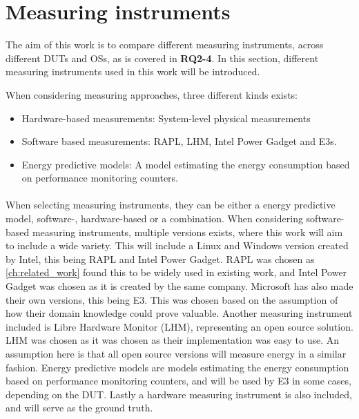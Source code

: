 \section{Measuring instruments}\label{sec:measuring_instruments}

The aim of this work is to compare different measuring instruments, across different DUTs and OSs, as is covered in \textbf{RQ2-4}. In this section, different measuring instruments used in this work will be introduced.

When considering measuring approaches, three different kinds exists:

\begin{itemize}
    \item Hardware-based measurements: System-level physical measurements
    \item Software based measurements: RAPL, LHM, Intel Power Gadget and E3s.
    \item Energy predictive models: A model estimating the energy consumption based on performance monitoring counters.
\end{itemize}

\paragraph*{}
When selecting measuring instruments, they can be either a energy predictive model, software-, hardware-based or a combination. When considering software-based measuring instruments, multiple versions exists, where this work will aim to include a wide variety. This will include a Linux and Windows version created by Intel, this being RAPL and Intel Power Gadget. RAPL was chosen as \cref*{ch:related_work} found this to be widely used in existing work, and Intel Power Gadget was chosen as it is created by the same company. Microsoft has also made their own versions, this being E3. This was chosen based on the assumption of how their domain knowledge could prove valuable. Another measuring instrument included is Libre Hardware Monitor (LHM), representing an open source solution. LHM was chosen as it was chosen as their implementation was easy to use. An assumption here is that all open source versions will measure energy in a similar fashion. Energy predictive models are models estimating the energy consumption based on performance monitoring counters, and will be used by E3 in some cases, depending on the DUT. Lastly a hardware measuring instrument is also included, and will serve as the ground truth.



